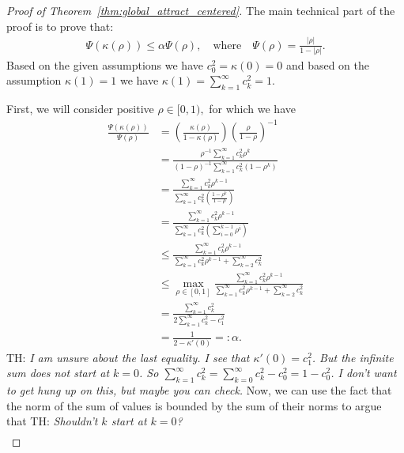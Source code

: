 \documentclass[twoside]{article}
\newcommand{\E}{\mathbb{E}}
\theoremstyle{definition}
\newcommand{\thomas}[1]{{\color{blue}TH:  \textit{#1}}}
\begin{document}
\begin{proof}[Proof of Theorem~\ref{thm:global_attract_centered}]
 The main technical part of the proof is to prove that:
    \begin{align*}
        \Psi(\kappa(\rho)) \le \alpha \Psi(\rho), \quad \text{where} \quad \Psi(\rho) = \frac{|\rho|}{1-|\rho|}.
    \end{align*}
Based on the given assumptions we have $c_0^2 = \kappa(0) = 0$ and based on the assumption $\kappa(1)=1$ we have $\kappa(1)=\sum_{k=1}^\infty c_k^2 = 1.$  
    
 First, we will consider positive $\rho\in[0,1),$ for which we have
    \begin{align*}
 \frac{\Psi(\kappa(\rho))}{\Psi(\rho)}&=\left(\frac{\kappa(\rho)}{1-\kappa(\rho)}\right)  \left(\frac{\rho}{1-\rho}\right)^{-1}\\  
        &= \frac{\rho^{-1}\sum_{k=1}^\infty c_k^2 \rho^{k} }{(1-\rho)^{-1}\sum_{k=1}^\infty c_k^2 (1-\rho^{k})} \\
        &= \frac{\sum_{k=1}^\infty c_k^2 \rho^{k-1}}{\sum_{k=1}^\infty c_k^2 \left(\frac{1-\rho^{k}}{1-\rho}\right)}\\
        &= \frac{\sum_{k=1}^\infty c_k^2 \rho^{k-1}}{\sum_{k=1}^\infty c_k^2 \left(\sum_{i=0}^{k-1}\rho^{i}\right)}\\
        &\le \frac{\sum_{k=1}^\infty c_k^2\rho^{k-1} }{\sum_{k=1}^\infty c_k^2 \rho^{k-1} + \sum_{k=2}^\infty c_k^2}\\
        &\le \max_{\rho\in[0,1]} \frac{\sum_{k=1}^\infty c_k^2\rho^{k-1} }{\sum_{k=1}^\infty c_k^2 \rho^{k-1} + \sum_{k=2}^\infty c_k^2}\\
        &= \frac{\sum_{k=1}^\infty c_k^2}{2\sum_{k=1}^\infty c_k^2 -c_1^2 } \\
        &=\frac{1}{2-\kappa'(0)} =: \alpha.
    \end{align*}
\thomas{I am unsure about the last equality. I see that $\kappa'(0)=c_1^2$. But the infinite sum does not start at $k=0$. So $\sum_{k=1}^\infty c_k^2 = \sum_{k=0}^\infty c_k^2-c_0^2 = 1 - c_0^2$. I don't want to get hung up on this, but maybe you can check.}
 Now, we can use the fact that the norm of the sum of values is bounded by the sum of their norms to argue that \thomas{Shouldn't $k$ start at $k=0$?}
\begin{align*}

\end{align*}
\end{proof}
\end{document}
